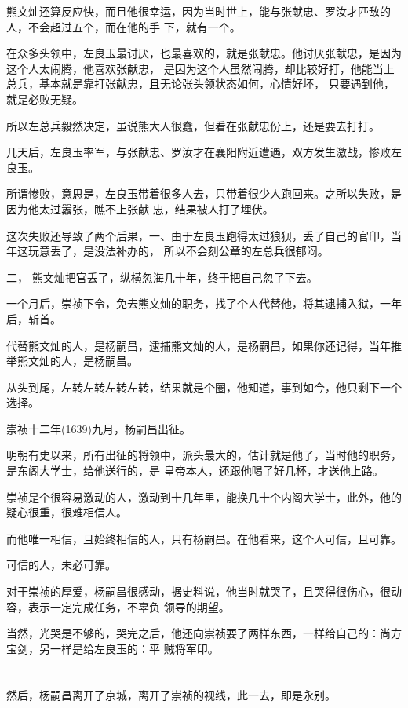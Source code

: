 \documentclass[11pt,a4paper,onecolumn]{article}
\begin{document}
熊文灿还算反应快，而且他很幸运，因为当时世上，能与张献忠、罗汝才匹敌的人，不会超过五个，而在他的手
下，就有一个。

在众多头领中，左良玉最讨厌，也最喜欢的，就是张献忠。他讨厌张献忠，是因为这个人太闹腾，他喜欢张献忠，
是因为这个人虽然闹腾，却比较好打，他能当上总兵，基本就是靠打张献忠，且无论张头领状态如何，心情好坏，
只要遇到他，就是必败无疑。

所以左总兵毅然决定，虽说熊大人很蠢，但看在张献忠份上，还是要去打打。

几天后，左良玉率军，与张献忠、罗汝才在襄阳附近遭遇，双方发生激战，惨败\myrule 左良玉。

所谓惨败，意思是，左良玉带着很多人去，只带着很少人跑回来。之所以失败，是因为他太过嚣张，瞧不上张献
忠，结果被人打了埋伏。

这次失败还导致了两个后果，一、由于左良玉跑得太过狼狈，丢了自己的官印，当年这玩意丢了，是没法补办的，
所以不会刻公章的左总兵很郁闷。

二， 熊文灿把官丢了，纵横忽海几十年，终于把自己忽了下去。

一个月后，崇祯下令，免去熊文灿的职务，找了个人代替他，将其逮捕入狱，一年后，斩首。

代替熊文灿的人，是杨嗣昌，逮捕熊文灿的人，是杨嗣昌，如果你还记得，当年推举熊文灿的人，是杨嗣昌。

从头到尾，左转左转左转左转，结果就是个圈，他知道，事到如今，他只剩下一个选择。

崇祯十二年(1639)九月，杨嗣昌出征。

明朝有史以来，所有出征的将领中，派头最大的，估计就是他了，当时他的职务，是东阁大学士，给他送行的，是
皇帝本人，还跟他喝了好几杯，才送他上路。

崇祯是个很容易激动的人，激动到十几年里，能换几十个内阁大学士，此外，他的疑心很重，很难相信人。

而他唯一相信，且始终相信的人，只有杨嗣昌。在他看来，这个人可信，且可靠。

可信的人，未必可靠。

对于崇祯的厚爱，杨嗣昌很感动，据史料说，他当时就哭了，且哭得很伤心，很动容，表示一定完成任务，不辜负
领导的期望。

当然，光哭是不够的，哭完之后，他还向崇祯要了两样东西，一样给自己的：尚方宝剑，另一样是给左良玉的：平
贼将军印。

\section[\thesection]{}

然后，杨嗣昌离开了京城，离开了崇祯的视线，此一去，即是永别。
\end{document}
